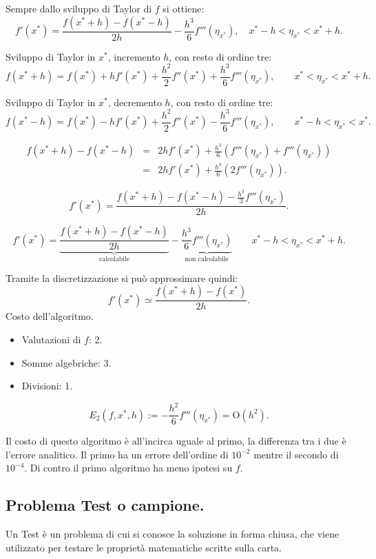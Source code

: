 \begin{flushleft}
Sempre dallo sviluppo di Taylor di $f$ si ottiene:
\[f'(x^*) = \frac{f(x^* + h) - f(x^* - h)}{2h} - \frac{h^3}{6}f'''(\eta_{x^*}), 
\quad x^*-h < \eta_{x^*}< x^* +h. \]

Sviluppo di Taylor in $x^*$, incremento $h$, con resto di ordine tre:
\[
f(x^* + h) = f(x^*) + hf'(x^*) + \frac{h^2}{2}f''(x^*) + 
\frac{h^3}{6}f'''(\eta_{x^*}), \qquad x^* < \eta_{x^*}
< x^* +h. 
\]

Sviluppo di Taylor in $x^*$, decremento $h$, con resto di ordine tre:
\[
f(x^* - h) = f(x^*) - hf'(x^*) + \frac{h^2}{2}f''(x^*) - 
\frac{h^3}{6}f'''(\eta_{x^*}), \qquad x^*- h < \eta_{x^*}
< x^*. 
\]

\[
\begin{array}{lcl}
f(x^* + h) - f(x^* - h) & = & 2hf'(x^*) + \frac{h^3}{6}\left(f'''(\eta_{x^*}) +
f'''(\eta_{x^*})\right) \\
& = & 2hf'(x^*) + \frac{h^3}{6}\left(2f'''(\eta_{x^*})\right).
\end{array}
\]

\[
f'(x^*) = \frac{f(x^* + h) - f(x^* - h) -\frac{h^3}{3}f'''(\eta_{x^*})}{2h}.
\]

\[
f'(x^*) = \underbrace{\frac{f(x^* + h) - f(x^* - h)}{2h}}_{\textrm{calcolabile}} -
\underbrace{\frac{h^3}{6}f'''(\eta_{x^*})}_{\textrm{non calcolabile}}
\qquad x^*- h < \eta_{x^*} < x^*+h. 
\]

Tramite la discretizzazione si può approssimare quindi:
\[f'(x^*) \simeq \frac{f(x^* + h) - f(x^*)}{2h} .\]
Costo dell'algoritmo.
\begin{itemize}
\item[]Valutazioni di $f$: 2.
\item[]Somme algebriche: 3.
\item[]Divisioni: 1.
\end{itemize}
\[E_{2}(f, x^*, h) := - \frac{h^2}{6}f'''(\eta_{x^*}) = \textrm{O}(h^2).\]
\end{flushleft}
Il costo di questo algoritmo è all'incirca uguale al primo, la differenza
tra i due è l'errore analitico. Il primo ha un errore dell'ordine di $10^{-2}$
mentre il secondo di $10^{-4}$. Di contro il primo algoritmo ha meno ipotesi
su $f$.

\subsection{Problema Test o campione.}
Un Test è un problema di cui si conosce la soluzione in forma chiusa, che
viene utilizzato per testare le proprietà matematiche scritte sulla carta.

